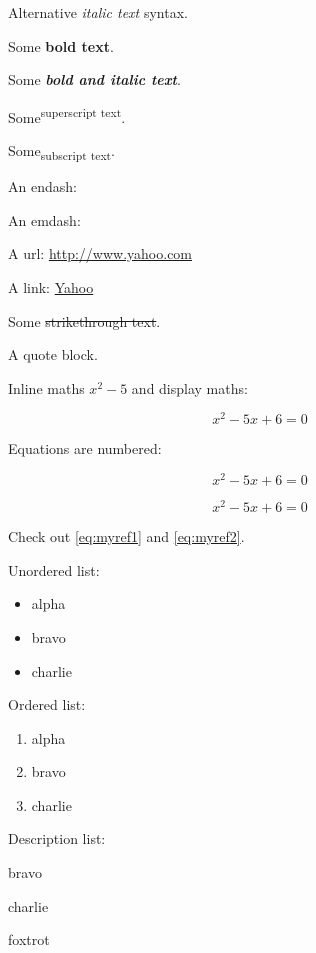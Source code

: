 \documentclass{article}
\theoremstyle{definition}
\theoremstyle{remark}
\begin{document}
Alternative \textit{italic text} syntax.

Some \textbf{bold text}.

Some \emph{\textbf{bold and italic text}}.

Some\textsuperscript{superscript text}.

Some\textsubscript{subscript text}.

An endash: \textendash

An emdash: \textemdash

A url: \url{http://www.yahoo.com}

A link: \href{http://www.yahoo.com}{Yahoo}

Some \sout{strikethrough text}.

\begin{displayquote}
A quote block.
\end{displayquote}

Inline maths $x^2 - 5$ and display maths:

$$
x^2 - 5 x + 6 = 0
$$

Equations are numbered:

\begin{equation}
\label{eq:myref1}
x^2 - 5 x + 6 = 0
\end{equation}

\begin{equation}
x^2 - 5 x + 6 = 0
\end{equation}

Check out \autoref{eq:myref1} and \autoref{eq:myref2}.

Unordered list:

\begin{itemize}
\item alpha
\item bravo
\item charlie
\end{itemize}

Ordered list:

\begin{enumerate}
\item alpha
\item bravo
\item charlie
\end{enumerate}

Description list:

\begin{description}
\item[alpha] bravo
\item charlie
\item[delta] foxtrot
\end{description}
\end{document}
